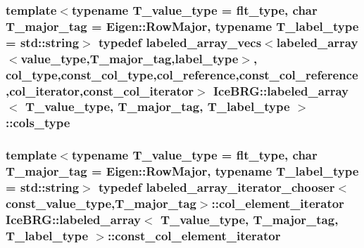 \subsubsection[{cols\+\_\+type}]{\setlength{\rightskip}{0pt plus 5cm}template$<$typename T\+\_\+value\+\_\+type = flt\+\_\+type, char T\+\_\+major\+\_\+tag = Eigen\+::\+Row\+Major, typename T\+\_\+label\+\_\+type = std\+::string$>$ typedef {\bf labeled\+\_\+array\+\_\+vecs}$<${\bf labeled\+\_\+array}$<${\bf value\+\_\+type},T\+\_\+major\+\_\+tag,{\bf label\+\_\+type}$>$, {\bf col\+\_\+type},{\bf const\+\_\+col\+\_\+type},{\bf col\+\_\+reference},{\bf const\+\_\+col\+\_\+reference},{\bf col\+\_\+iterator},{\bf const\+\_\+col\+\_\+iterator}$>$ {\bf Ice\+B\+R\+G\+::labeled\+\_\+array}$<$ T\+\_\+value\+\_\+type, T\+\_\+major\+\_\+tag, T\+\_\+label\+\_\+type $>$\+::{\bf cols\+\_\+type}}\label{classIceBRG_1_1labeled__array_a4592932c9e975c4777e0d89990ac4e5a}
\hypertarget{classIceBRG_1_1labeled__array_a6f847eeeec0a510c85832e235923f374}{}
\subsubsection[{const\+\_\+col\+\_\+element\+\_\+iterator}]{\setlength{\rightskip}{0pt plus 5cm}template$<$typename T\+\_\+value\+\_\+type = flt\+\_\+type, char T\+\_\+major\+\_\+tag = Eigen\+::\+Row\+Major, typename T\+\_\+label\+\_\+type = std\+::string$>$ typedef {\bf labeled\+\_\+array\+\_\+iterator\+\_\+chooser}$<${\bf const\+\_\+value\+\_\+type},T\+\_\+major\+\_\+tag$>$\+::{\bf col\+\_\+element\+\_\+iterator} {\bf Ice\+B\+R\+G\+::labeled\+\_\+array}$<$ T\+\_\+value\+\_\+type, T\+\_\+major\+\_\+tag, T\+\_\+label\+\_\+type $>$\+::{\bf const\+\_\+col\+\_\+element\+\_\+iterator}}\label{classIceBRG_1_1labeled__array_a6f847eeeec0a510c85832e235923f374}
\hypertarget{classIceBRG_1_1labeled__array_a2fd3d1ad11efc9bbfb307619cda3a695}{}
